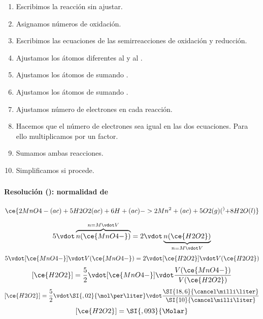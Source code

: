 \begin{frame}
\begin{enumerate}[label={\alph*)},font={\color{red!50!black}\bfseries}]
        \item<1-> Escribimos la reacción sin ajustar.
        \item<2-> Asignamos números de oxidación.
        \item<3-> Escribimos las ecuaciones de las semirreacciones de oxidación y reducción.
        \item<4-> Ajustamos los átomos diferentes al  y al .
        \item<5-> Ajustamos los átomos de  sumando .
        \item<6-> Ajustamos los átomos de  sumando .
        \item<7-> Ajustamos número de electrones en cada reacción.
        \item<8-> Hacemos que el número de electrones sea igual en las dos ecuaciones. Para ello multiplicamos por un factor.
        \item<10-> Sumamos ambas reacciones.
        \item<11-> Simplificamos si procede.
    \end{enumerate}
\end{frame}

\begin{frame}
    \frametitle{\ejerciciocmd}
    \framesubtitle{Resolución (): normalidad de }
    $$
        \ce{2MnO4-(ac) + 5H2O2(ac) + 6H+(ac) -> 2Mn^2+(ac) + 5O2(g) (^) + 8H2O(l)}
    $$
    \begin{overprint}
            $$
                5\vdot \overbrace{n(\ce{MnO4-})}^{n=M\vdot V} = 2\vdot \underbrace{n(\ce{H2O2})}_{n=M\vdot V}
            $$
            $$
                5\vdot[\ce{MnO4-}]\vdot V(\ce{MnO4-}) = 2\vdot[\ce{H2O2}]\vdot V(\ce{H2O2})
            $$
            $$
                 [\ce{H2O2}] = \frac{5}{2}\vdot[\ce{MnO4-}]\vdot \frac{V(\ce{MnO4-})}{V(\ce{H2O2})}
            $$
            $$
                [\ce{H2O2}] = \frac{5}{2}\vdot\SI{,02}{\mol\per\liter}\vdot \frac{\SI{18,6}{\cancel\milli\liter}}{\SI{10}{\cancel\milli\liter}}
            $$
            $$
                [\ce{H2O2}] = \SI{,093}{\Molar}
            $$
    \end{overprint}
\end{frame}

